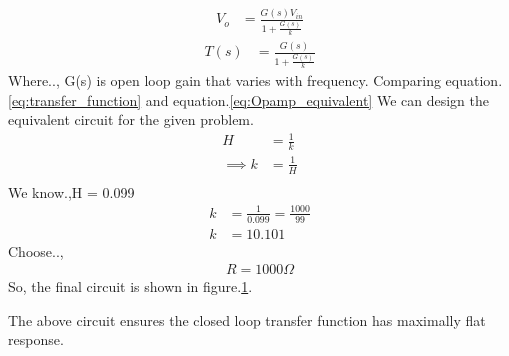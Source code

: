 \begin{enumerate}[label=\thesubsection.\arabic*.,ref=\thesubsection.\theenumi]
\begin{align}
  V_o &= \frac{G(s)V_{in}}{1+\frac{G(s)}{k}}
  \end{align}
  \begin{align}
  T(s) &= \frac{G(s)}{1+\frac{G(s)}{k}}\label{eq:Opamp_equivalent}
\end{align}
Where.., G(s) is open loop gain that varies with frequency.
Comparing equation.\ref{eq:transfer_function} and equation.\ref{eq:Opamp_equivalent}
We can design the equivalent circuit for the given problem.
\begin{align}
H &= \frac{1}{k}\\
\implies k &= \frac{1}{H}\\
\end{align}
We know.,H = 0.099
\begin{align}
k &= \frac{1}{0.099} = \frac{1000}{99}\\
k &= 10.101
\end{align}
Choose..,
\begin{align}
    R = 1000 \Omega
\end{align}
So, the final circuit is shown in figure.\ref{fig:final_circuit}.
\begin{figure}[!ht]
	\begin{center}
			\resizebox{\columnwidth}{!}{}
	\end{center}
\caption{}
\label{fig:final_circuit}
\end{figure}
The above circuit ensures the closed loop transfer function has maximally flat response.
\end{enumerate}

